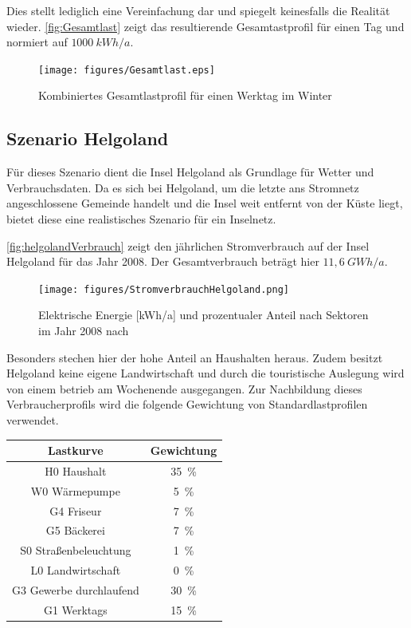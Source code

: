 Dies stellt lediglich eine Vereinfachung dar und spiegelt keinesfalls die Realität wieder. \autoref{fig:Gesamtlast} zeigt das resultierende Gesamtastprofil für einen Tag und normiert auf $1000~kWh/a$.

\begin{figure}[H]
	\centering
	\texttt{[image: figures/Gesamtlast.eps]}
	\caption{Kombiniertes Gesamtlastprofil für einen Werktag im Winter}
	\label{fig:Gesamtlast}
\end{figure}

\subsection{Szenario Helgoland}

Für dieses Szenario dient die Insel Helgoland als Grundlage für Wetter und Verbrauchsdaten. Da es sich bei Helgoland, um die letzte ans Stromnetz angeschlossene Gemeinde handelt und die Insel weit entfernt von der Küste liegt, bietet diese eine realistisches Szenario für ein Inselnetz.

\autoref{fig:helgolandVerbrauch} zeigt den jährlichen Stromverbrauch auf der Insel Helgoland für das Jahr 2008. Der Gesamtverbrauch beträgt hier $11,6~GWh/a$.

\begin{figure}[H]
	\centering
	\texttt{[image: figures/StromverbrauchHelgoland.png]}
	\caption{Elektrische Energie [kWh/a] und prozentualer Anteil nach Sektoren im Jahr 2008 nach \cite{Helgoland}}
	\label{fig:helgolandVerbrauch}
\end{figure}

Besonders stechen hier der hohe Anteil an Haushalten heraus. Zudem besitzt Helgoland keine eigene Landwirtschaft und durch die touristische Auslegung wird von einem betrieb am Wochenende ausgegangen. Zur Nachbildung dieses Verbraucherprofils wird die folgende Gewichtung von Standardlastprofilen verwendet.

\begin{center}
	\begin{tabular}[htpb]{c|c}
		\textbf{Lastkurve} & \textbf{Gewichtung} \\
		\hline
		H0 Haushalt & 35~\% \\
		W0 Wärmepumpe & 5~\% \\
		G4 Friseur & 7~\% \\
		G5 Bäckerei & 7~\% \\
		S0 Straßenbeleuchtung & 1~\% \\
		L0 Landwirtschaft & 0~\% \\
		G3 Gewerbe durchlaufend & 30~\% \\
		G1 Werktags & 15~\% 
	\end{tabular}
\end{center}

